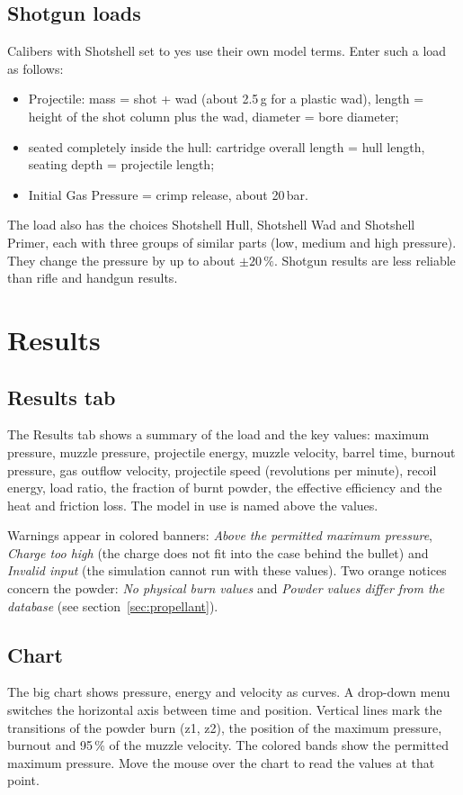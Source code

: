 \documentclass[11pt,a4paper]{article}
\newcommand{\ui}[1]{\textsf{#1}}
\begin{document}
\subsection{Shotgun loads}
Calibers with \ui{Shotshell} set to yes use their own model terms. Enter such a load as follows:
\begin{itemize}
  \item \ui{Projectile}: mass = shot + wad (about 2.5\,g for a plastic wad), length = height of the shot column plus the wad,
        diameter = bore diameter;
  \item seated completely inside the hull: cartridge overall length = hull length, seating depth = projectile length;
  \item \ui{Initial Gas Pressure} = crimp release, about 20\,bar.
\end{itemize}
The load also has the choices \ui{Shotshell Hull}, \ui{Shotshell Wad} and \ui{Shotshell Primer}, each with three groups of similar parts
(low, medium and high pressure). They change the pressure by up to about $\pm 20\,\%$. Shotgun results are less reliable than rifle
and handgun results.

\section{Results}

\subsection{Results tab}
The \ui{Results} tab shows a summary of the load and the key values: maximum pressure, muzzle pressure, projectile energy, muzzle
velocity, barrel time, burnout pressure, gas outflow velocity, projectile speed (revolutions per minute), recoil energy, load ratio, the fraction of burnt
powder, the effective efficiency and the heat and friction loss. The model in use is named above the values.

Warnings appear in colored banners: \emph{Above the permitted maximum pressure}, \emph{Charge too high} (the charge does not fit into the case behind
the bullet) and \emph{Invalid input} (the simulation cannot run with these values). Two orange notices concern the powder: \emph{No physical burn
values} and \emph{Powder values differ from the database} (see section~\ref{sec:propellant}).

\subsection{Chart}
The big chart shows pressure, energy and velocity as curves. A drop-down menu switches the horizontal axis between time and position. Vertical
lines mark the transitions of the powder burn (z1, z2), the position of the maximum pressure, burnout and 95\,\% of the muzzle velocity. The colored
bands show the permitted maximum pressure. Move the mouse over the chart to read the values at that point.
\end{document}
